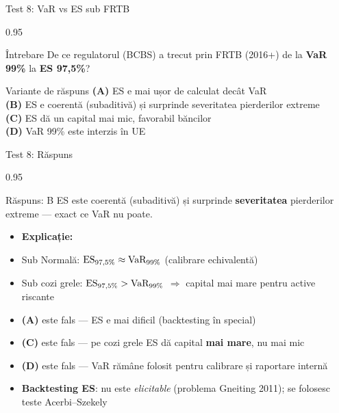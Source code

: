 \documentclass[9pt, aspectratio=169, t]{beamer}
\begin{document}
\begin{frame}[shrink=10]{Test 8: VaR vs ES sub FRTB}
\begin{cminipage}{0.95\textwidth}
    \begin{alertblock}{Întrebare}
    De ce regulatorul (BCBS) a trecut prin FRTB (2016+) de la \textbf{VaR 99\%} la \textbf{ES 97{,}5\%}?
    \end{alertblock}
    \vspace{0.4cm}
    \begin{block}{Variante de răspuns}
    \textcolor{MainBlue}{\textbf{(A)}} ES e mai ușor de calculat decât VaR \\[3pt]
    \textcolor{MainBlue}{\textbf{(B)}} ES e coerentă (subaditivă) și surprinde severitatea pierderilor extreme \\[3pt]
    \textcolor{MainBlue}{\textbf{(C)}} ES dă un capital mai mic, favorabil băncilor \\[3pt]
    \textcolor{MainBlue}{\textbf{(D)}} VaR 99\% este interzis în UE
    \end{block}
\end{cminipage}
\end{frame}

\begin{frame}[shrink=10]{Test 8: Răspuns}
\begin{cminipage}{0.95\textwidth}
    \begin{exampleblock}{Răspuns: B}
    ES este coerentă (subaditivă) și surprinde \textbf{severitatea} pierderilor extreme --- exact ce VaR nu poate.
    \end{exampleblock}
    \vspace{0.2cm}
    \begin{itemize}\setlength{\itemsep}{0pt}
        \item \textbf{Explicație:}
        \item Sub Normală: $\text{ES}_{97{,}5\%} \approx \text{VaR}_{99\%}$ (calibrare echivalentă)
        \item Sub cozi grele: $\text{ES}_{97{,}5\%} > \text{VaR}_{99\%}$ $\Rightarrow$ capital mai mare pentru active riscante
        \item \textbf{(A)} este fals --- ES e mai dificil (backtesting în special)
        \item \textbf{(C)} este fals --- pe cozi grele ES dă capital \textbf{mai mare}, nu mai mic
        \item \textbf{(D)} este fals --- VaR rămâne folosit pentru calibrare și raportare internă
        \item \textbf{Backtesting ES}: nu este \textit{elicitable} (problema Gneiting 2011); se folosesc teste Acerbi--Szekely
    \end{itemize}
\end{cminipage}
\end{frame}
\end{document}
